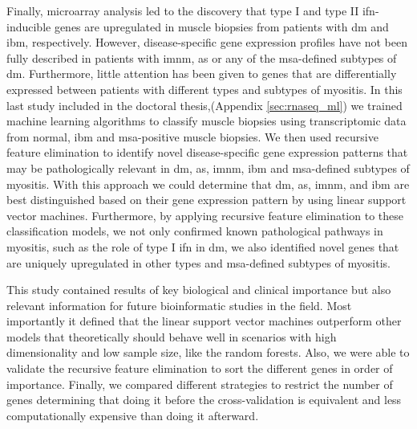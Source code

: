 Finally, microarray analysis led to the discovery that type I and type II \gls{ifn}-inducible genes are upregulated in muscle biopsies from patients with \gls{dm}\cite{Greenberg2005} and \gls{ibm},\cite{Ivanidze2011,Allenbach2014} respectively. However, disease-specific gene expression profiles have not been fully described in patients with \gls{imnm}, \gls{as} or any of the \gls{msa}-defined subtypes of \gls{dm}. Furthermore, little attention has been given to genes that are differentially expressed between patients with different types and subtypes of myositis.\cite{Greenberg2005,Greenberg2002,Hamann2017,Raju2005} In this last study included in the doctoral thesis,(Appendix \autoref{sec:rnaseq_ml}) we trained machine learning algorithms to classify muscle biopsies using transcriptomic data from normal, \gls{ibm} and \gls{msa}-positive muscle biopsies. We then used recursive feature elimination to identify novel disease-specific gene expression patterns that may be pathologically relevant in \gls{dm},  \gls{as}, \gls{imnm}, \gls{ibm} and \gls{msa}-defined subtypes of myositis. With this approach we could determine that \gls{dm},  \gls{as}, \gls{imnm}, and \gls{ibm} are best distinguished based on their gene expression pattern by using linear support vector machines. Furthermore, by applying recursive feature elimination to these classification models, we not only confirmed known pathological pathways in myositis, such as the role of type I \gls{ifn} in \gls{dm}, we also identified novel genes that are uniquely upregulated in other types and \gls{msa}-defined subtypes of myositis.

This study contained results of key biological and clinical importance but also relevant information for future bioinformatic studies in the field. Most importantly it defined that the linear support vector machines outperform other models that theoretically should behave well in scenarios with high dimensionality and low sample size, like the random forests. Also, we were able to validate the recursive feature elimination to sort the different genes in order of importance. Finally, we compared different strategies to restrict the number of genes determining that doing it before the cross-validation is equivalent and less computationally expensive than doing it afterward.